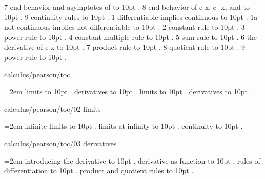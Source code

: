  7 end behavior and asymptotes of \leaders\hbox to 10pt {\hss.\hss}  \hfill {}
 8 end behavior of e x, e {-x}, and \leaders\hbox to 10pt {\hss.\hss}  \hfill {}
 9 continuity rules \leaders\hbox to 10pt {\hss.\hss}  \hfill {}
 1 differentiable implies continuous \leaders\hbox to 10pt {\hss.\hss}  \hfill {}
 1a not continuous implies not differentiable \leaders\hbox to 10pt {\hss.\hss}  \hfill {}
 2 constant rule \leaders\hbox to 10pt {\hss.\hss}  \hfill {}
 3 power rule \leaders\hbox to 10pt {\hss.\hss}  \hfill {}
 4 constant multiple rule \leaders\hbox to 10pt {\hss.\hss}  \hfill {}
 5 sum rule \leaders\hbox to 10pt {\hss.\hss}  \hfill {}
 6 the derivative of e x \leaders\hbox to 10pt {\hss.\hss}  \hfill {}
 7 product rule \leaders\hbox to 10pt {\hss.\hss}  \hfill {}
 8 quotient rule \leaders\hbox to 10pt {\hss.\hss}  \hfill {}
 9 power rule \leaders\hbox to 10pt {\hss.\hss}  \hfill {}
\smallskip
\par\endgroup
\bigskip
{}
calculus/pearson/toc
\par\begingroup
\leftskip=2em
 limits \leaders\hbox to 10pt {\hss.\hss}  \hfill {}
 derivatives \leaders\hbox to 10pt {\hss.\hss}  \hfill {}
\smallskip
{} limits \leaders\hbox to 10pt {\hss.\hss}  \hfill {}
 derivatives \leaders\hbox to 10pt {\hss.\hss}  \hfill {}
\smallskip
\par\endgroup
\bigskip
{}
calculus/pearson/toc/02 limits
\par\begingroup
\leftskip=2em
\smallskip
{} infinite limits \leaders\hbox to 10pt {\hss.\hss}  \hfill {}
 limits at infinity \leaders\hbox to 10pt {\hss.\hss}  \hfill {}
 continuity \leaders\hbox to 10pt {\hss.\hss}  \hfill {}
\smallskip
\par\endgroup
\bigskip
{}
calculus/pearson/toc/03 derivatives
\par\begingroup
\leftskip=2em
\smallskip
{} introducing the derivative \leaders\hbox to 10pt {\hss.\hss}  \hfill {}
 derivative as function \leaders\hbox to 10pt {\hss.\hss}  \hfill {}
 rules of differentiation \leaders\hbox to 10pt {\hss.\hss}  \hfill {}
 product and quotient rules \leaders\hbox to 10pt {\hss.\hss}  \hfill {}
